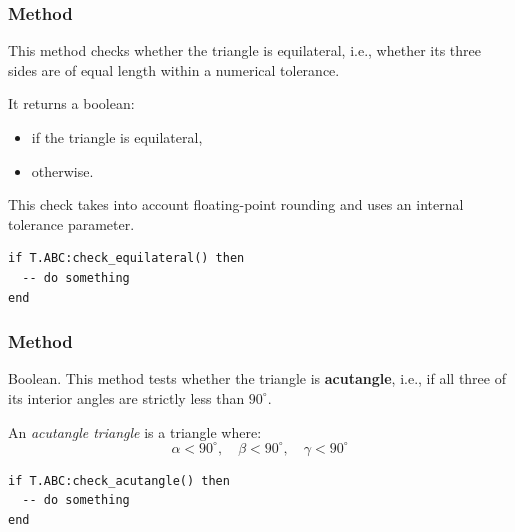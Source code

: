 \subsubsection{Method }
\label{ssub:_triangle_check__equilateral}

This method checks whether the triangle is equilateral, i.e., whether its three sides are of equal length within a numerical tolerance.

\medskip

It returns a boolean:
\begin{itemize}
  \item {} if the triangle is equilateral,
  \item {} otherwise.
\end{itemize}


This check takes into account floating-point rounding and uses an internal tolerance parameter.


\begin{mybox}
\begin{verbatim}
if T.ABC:check_equilateral() then
  -- do something
end
\end{verbatim}
\end{mybox}

\vspace{1em}

\subsubsection{Method }
\label{ssub:_triangle_check__acutangle}

Boolean. This method tests whether the triangle is \textbf{acutangle}, i.e., if all three of its interior angles are strictly less than $90^\circ$.

\medskip

An \emph{acutangle triangle} is a triangle where:
\[
\alpha < 90^\circ, \quad \beta < 90^\circ, \quad \gamma < 90^\circ
\]


\begin{mybox}
\begin{verbatim}
if T.ABC:check_acutangle() then
  -- do something
end
\end{verbatim}
\end{mybox}




